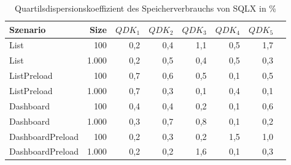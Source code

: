 
\begin{table}[ht]
\setlength{\extrarowheight}{-1pt}
\centering
\caption{Quartilsdispersionskoeffizient des Speicherverbrauchs von SQLX in \%}
\begin{tabular}{lrrrrrrr}
\toprule
Szenario & Size & ${QDK_1}$ & ${QDK_2}$ & ${QDK_3}$& ${QDK_4}$ & ${QDK_5}$ \\
\midrule
	List & 100 & \cellcolor{red!1}  0,2 & \cellcolor{red!1}  0,4 & \cellcolor{red!2}  1,1 & \cellcolor{red!1}  0,5 & \cellcolor{red!2}  1,7 \\
	List & 1.000 & \cellcolor{red!1}  0,2 & \cellcolor{red!1}  0,5 & \cellcolor{red!1}  0,4 & \cellcolor{red!1}  0,5 & \cellcolor{red!1}  0,3 \\
	ListPreload & 100 & \cellcolor{red!1}  0,7 & \cellcolor{red!1}  0,6 & \cellcolor{red!1}  0,5 & \cellcolor{red!1}  0,1 & \cellcolor{red!1}  0,5 \\
	ListPreload & 1.000 & \cellcolor{red!1}  0,7 & \cellcolor{red!1}  0,3 & \cellcolor{red!1}  0,1 & \cellcolor{red!1}  0,4 & \cellcolor{red!1}  0,1 \\
	Dashboard & 100 & \cellcolor{red!1}  0,4 & \cellcolor{red!1}  0,4 & \cellcolor{red!1}  0,2 & \cellcolor{red!1}  0,1 & \cellcolor{red!1}  0,6 \\
	Dashboard & 1.000 & \cellcolor{red!1}  0,3 & \cellcolor{red!1}  0,7 & \cellcolor{red!1}  0,8 & \cellcolor{red!1}  0,1 & \cellcolor{red!1}  0,2 \\
	DashboardPreload & 100 & \cellcolor{red!1}  0,2 & \cellcolor{red!1}  0,3 & \cellcolor{red!1}  0,2 & \cellcolor{red!2}  1,5 & \cellcolor{red!2}  1,0 \\
	DashboardPreload & 1.000 & \cellcolor{red!1}  0,2 & \cellcolor{red!1}  0,2 & \cellcolor{red!2}  1,6 & \cellcolor{red!1}  0,1 & \cellcolor{red!1}  0,3 \\
\bottomrule
\end{tabular}
\label{tab:quartilsdispersionskoeffizient_speicherverbrauch_sqlx}
\end{table}
	